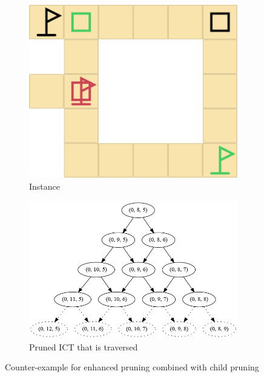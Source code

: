 \documentclass[english]{article}
\begin{document}
	\begin{figure}[H]
		\centering
		\begin{subfigure}{0.40\textwidth}
			\centering
			\includegraphics[width=\linewidth]{img/counter-example-ep-2}
			\caption{Instance}
			\label{fig:counter-example:a}
		\end{subfigure}
		\begin{subfigure}{0.49\textwidth}
			\centering
			\includegraphics[width=\linewidth]{img/counter-example-tree}
			\caption{Pruned ICT that is traversed}
			\label{fig:counter-example:b}
		\end{subfigure}
		\caption{Counter-example for enhanced pruning combined with child pruning}
		\label{fig:counter-example}
	\end{figure}
\end{document}
